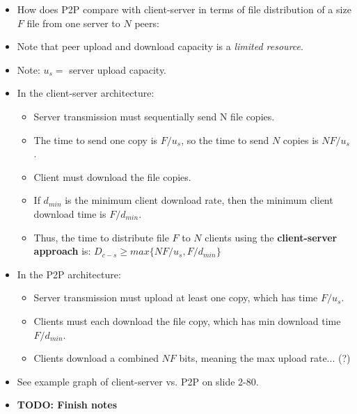 \documentclass{article}
\begin{document}
\begin{itemize}
\item How does P2P compare with client-server in terms of file distribution of a size $F$ file from one server to $N$ peers:
\item Note that peer upload and download capacity is a \emph{limited resource}.
\item Note: $u_s = $ server upload capacity.
\item In the client-server architecture:
\begin{itemize}
\item Server transmission must sequentially send N file copies.
\item The time to send one copy is $F/u_s$, so the time to send $N$ copies is $NF/u_s$.
\item Client must download the file copies.
\item If $d_{min}$ is the minimum client download rate, then the minimum client download time is $F/d_{min}$.
\item Thus, the time to distribute file $F$ to $N$ clients using the {\bf client-server approach} is: $D_{c-s} \ge max\{NF/u_s,F/d_{min}\}$
\end{itemize}
\item In the P2P architecture:
\begin{itemize}
\item Server transmission must upload at least one copy, which has time $F/u_s$.
\item Clients must each download the file copy, which has min download time $F/d_{min}$.
\item Clients download a combined $NF$ bits, meaning the max upload rate... (?)
\end{itemize}
\item See example graph of client-server vs. P2P on slide 2-80.
\item {\bf TODO: Finish notes}
\end{itemize}
\end{document}

